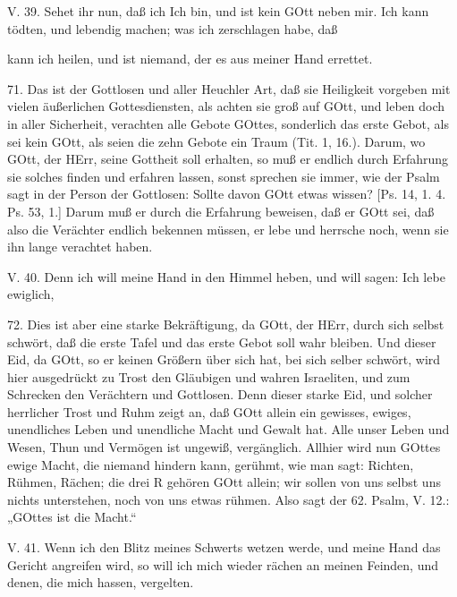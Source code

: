 \begin{schriftzitat}
V. 39. Sehet ihr nun, daß ich Ich bin, und ist kein GOtt neben mir. Ich kann tödten, und lebendig machen; was ich zerschlagen habe, daß
\end{schriftzitat}

kann ich heilen, und ist niemand, der es aus meiner Hand errettet.

71. Das ist der Gottlosen und aller Heuchler Art, daß sie Heiligkeit vorgeben mit vielen äußerlichen Gottesdiensten, als achten sie groß auf GOtt, und leben doch in aller Sicherheit, verachten alle Gebote GOttes, sonderlich das erste Gebot, als sei kein GOtt, als seien die zehn Gebote ein Traum (Tit. 1, 16.). Darum, wo GOtt, der HErr, seine Gottheit soll erhalten, so muß er endlich durch Erfahrung sie solches finden und erfahren lassen, sonst sprechen sie immer, wie der Psalm sagt in der Person der Gottlosen: Sollte davon GOtt etwas wissen? [Ps. 14, 1. 4. Ps. 53, 1.] Darum muß er durch die Erfahrung beweisen, daß er GOtt sei, daß also die Verächter endlich bekennen müssen, er lebe und herrsche noch, wenn sie ihn lange verachtet haben.

\begin{schriftzitat}
V. 40. Denn ich will meine Hand in den Himmel heben, und will sagen: Ich lebe ewiglich,
\end{schriftzitat}

72. Dies ist aber eine starke Bekräftigung, da GOtt, der HErr, durch sich selbst schwört, daß die erste Tafel und das erste Gebot soll wahr bleiben. Und dieser Eid, da GOtt, so er keinen Größern über sich hat, bei sich selber schwört, wird hier ausgedrückt zu Trost den Gläubigen und wahren Israeliten, und zum Schrecken den Verächtern und Gottlosen. Denn dieser starke Eid, und solcher herrlicher Trost und Ruhm zeigt an, daß GOtt allein ein gewisses, ewiges, unendliches Leben und unendliche Macht und Gewalt hat. Alle unser Leben und Wesen, Thun und Vermögen ist ungewiß, vergänglich. Allhier wird nun GOttes ewige Macht, die niemand hindern kann, gerühmt, wie man sagt: Richten, Rühmen, Rächen; die drei R gehören GOtt allein; wir sollen von uns selbst uns nichts unterstehen, noch von uns etwas rühmen. Also sagt der 62. Psalm, V. 12.: „GOttes ist die Macht.“

\begin{schriftzitat}
V. 41. Wenn ich den Blitz meines Schwerts wetzen werde, und meine Hand das Gericht angreifen wird, so will ich mich wieder rächen an meinen Feinden, und denen, die mich hassen, vergelten.
\end{schriftzitat}

